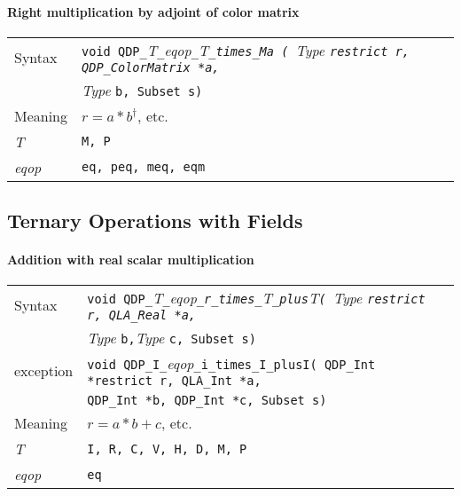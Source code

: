 \documentclass{article}
\newcommand{\tInt}{QDP\ttdash Int }
\newcommand{\tColorMatrix}{QDP\ttdash ColorMatrix }
\newcommand{\tqlaReal}{QLA\ttdash Real }
\newcommand{\tqlaInt}{QLA\ttdash Int }
\newcommand{\namespace}{QDP}
\newcommand{\allEqOps}{{\tt eq, peq, meq, eqm}}
\newcommand{\allNumericTypes}{{\tt I, R, C, V, H, D, M, P}}
\newcommand{\ttdash}{{\tt \_}}
\newcommand{\itt}{\it T}
\newcommand{\extraarg}{, Subset s}
\begin{document}
\paragraph{Right multiplication by adjoint of color matrix}

\begin{flushleft}
  \begin{tabular}{|l|l|}
  \hline
  Syntax      & {\tt void \namespace}\ttdash\itt\ttdash{\it eqop}\ttdash\itt\ttdash{\tt times}\ttdash{\tt Ma ( }{\it Type }{\tt *restrict r, \tColorMatrix *a, }\\
              & {\it Type }{\tt *b\extraarg)} \\
  \hline
  Meaning     & $r = a * b^\dagger$, etc. \\
  \hline
  \itt        & {\tt M, P} \\
  \hline
  {\it eqop}  & \allEqOps \\
  \hline
  \end{tabular}
\end{flushleft}

\subsection{Ternary Operations with Fields}

\paragraph{Addition with real scalar multiplication}

\begin{flushleft}
  \begin{tabular}{|l|l|}
  \hline
  Syntax      & {{\tt void \namespace}\ttdash\itt\ttdash{\it eqop}\ttdash{\tt r}\ttdash{\tt times}\ttdash\itt\ttdash{\tt plus}\itt{\tt ( }{\it Type }{\tt *restrict r, \tqlaReal *a,}}\\
               & {{\it Type }{\tt *b,}{\it Type }{\tt *c\extraarg)}} \\
  exception    & {\tt void \namespace}\ttdash{\tt I}\ttdash{\it eqop}\ttdash{\tt i}\ttdash{\tt times}\ttdash{\tt I}\ttdash{\tt plus}{\tt I( \tInt *restrict r, \tqlaInt *a,}\\
              & {\tt \tInt *b, \tInt *c\extraarg)} \\
  \hline
  Meaning     & $r = a * b + c$, etc. \\
  \hline
  \itt        & \allNumericTypes \\
  \hline
  {\it eqop}  & {\tt eq} \\
  \hline
  \end{tabular}
\end{flushleft}
\end{document}
